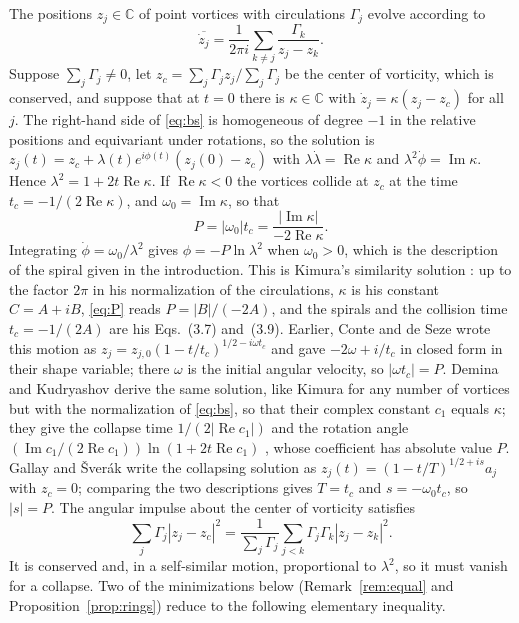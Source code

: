 \documentclass[11pt]{article}
\theoremstyle{definition}
\newcommand{\re}{\operatorname{Re}}
\newcommand{\im}{\operatorname{Im}}
\newcommand{\C}{\mathbb{C}}
\begin{document}
The positions $z_j \in \C$ of point vortices with circulations $\Gamma_j$ evolve according to
\begin{equation}\label{eq:bs}
  \overline{\dot z_j} = \frac{1}{2\pi i} \sum_{k \ne j} \frac{\Gamma_k}{z_j - z_k}.
\end{equation}
Suppose $\sum_j \Gamma_j \ne 0$, let $z_c = \sum_j \Gamma_j z_j / \sum_j \Gamma_j$ be the center of vorticity, which is conserved, and suppose that at $t = 0$ there is $\kappa \in \C$ with $\dot z_j = \kappa (z_j - z_c)$ for all $j$. The right-hand side of \eqref{eq:bs} is homogeneous of degree $-1$ in the relative positions and equivariant under rotations, so the solution is $z_j(t) = z_c + \lambda(t) e^{i\phi(t)} (z_j(0) - z_c)$ with $\lambda \dot\lambda = \re\kappa$ and $\lambda^2 \dot\phi = \im\kappa$. Hence $\lambda^2 = 1 + 2t \re\kappa$. If $\re\kappa < 0$ the vortices collide at $z_c$ at the time $t_c = -1/(2\re\kappa)$, and $\omega_0 = \im\kappa$, so that
\begin{equation}\label{eq:P}
  P = |\omega_0| t_c = \frac{|\im\kappa|}{-2\re\kappa}.
\end{equation}
Integrating $\dot\phi = \omega_0/\lambda^2$ gives $\phi = -P \ln\lambda^2$ when $\omega_0 > 0$, which is the description of the spiral given in the introduction. This is Kimura's similarity solution \cite[Sect.~3.1]{kimura1987}: up to the factor $2\pi$ in his normalization of the circulations, $\kappa$ is his constant $C = A + iB$, \eqref{eq:P} reads $P = |B|/(-2A)$, and the spirals and the collision time $t_c = -1/(2A)$ are his Eqs.~(3.7) and~(3.9). Earlier, Conte and de Seze \cite[Sect.~4, pp.~24--25]{cds1980} wrote this motion as $z_j = z_{j,0} (1 - t/t_c)^{1/2 - i\omega t_c}$ and gave $-2\omega + i/t_c$ in closed form in their shape variable; there $\omega$ is the initial angular velocity, so $|\omega t_c| = P$. Demina and Kudryashov \cite[Eqs.~(7)--(12)]{dk2014} derive the same solution, like Kimura for any number of vortices but with the normalization of \eqref{eq:bs}, so that their complex constant $c_1$ equals $\kappa$; they give the collapse time $1/(2|\re c_1|)$ \cite[Eq.~(12)]{dk2014} and the rotation angle $(\im c_1/(2\re c_1))\ln(1 + 2t\re c_1)$ \cite[Eq.~(10)]{dk2014}, whose coefficient has absolute value $P$. Gallay and \v{S}ver\'ak \cite[Prop.~5.2, Eq.~(5.11)]{gallay2026} write the collapsing solution as $z_j(t) = (1 - t/T)^{1/2 + is} a_j$ with $z_c = 0$; comparing the two descriptions gives $T = t_c$ and $s = -\omega_0 t_c$, so $|s| = P$. The angular impulse about the center of vorticity satisfies
\begin{equation}\label{eq:L}
  \sum_j \Gamma_j |z_j - z_c|^2 = \frac{1}{\sum_j \Gamma_j} \sum_{j < k} \Gamma_j \Gamma_k |z_j - z_k|^2.
\end{equation}
It is conserved and, in a self-similar motion, proportional to $\lambda^2$, so it must vanish for a collapse. Two of the minimizations below (Remark~\ref{rem:equal} and Proposition~\ref{prop:rings}) reduce to the following elementary inequality.
\end{document}
